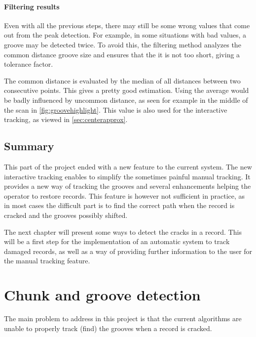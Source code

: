 \subsubsection{Filtering results}
\label{sec:groovefilter}

Even with all the previous steps, there may still be some wrong values that come out from the peak detection. For example, in some situations with bad values, a groove may be detected twice. To avoid this, the filtering method analyzes the common distance groove size and ensures that the it is not too short, giving a tolerance factor.

The common distance is evaluated by the median of all distances between two consecutive points. This gives a pretty good estimation. Using the average would be badly influenced by uncommon distance, as seen for example in the middle of the scan in \autoref{fig:groovehighlight}. This value is also used for the interactive tracking, as viewed in \ref{sec:centerapprox}.

\section{Summary}

This part of the project ended with a new feature to the current system. The new interactive tracking enables to simplify the sometimes painful manual tracking. It provides a new way of tracking the grooves and several enhancements helping the operator to restore records. This feature is however not sufficient in practice, as in most cases the difficult part is to find the correct path when the record is cracked and the grooves possibly shifted.

The next chapter will present some ways to detect the cracks in a record. This will be a first step for the implementation of an automatic system to track damaged records, as well as a way of providing further information to the user for the manual tracking feature.



\chapter{Chunk and groove detection}
\label{chap:groovedetect}

The main problem to address in this project is that the current algorithms are unable to properly track (find) the grooves when a record is cracked.

